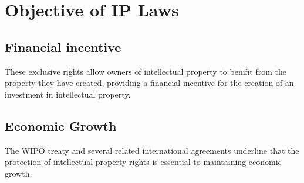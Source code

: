 \documentclass[a4paper,11pt]{article}
\begin{document}
\section{Objective of IP Laws}

\subsection{Financial incentive}
These exclusive rights allow owners of intellectual property to benifit from
the property they have created, providing a financial incentive for the
creation of an investment in intellectual property.

\subsection{Economic Growth}
The WIPO treaty and several related international agreements underline that the
protection of intellectual property rights is essential to maintaining economic
growth.

\clearpage
\newpage 
\end{document}
